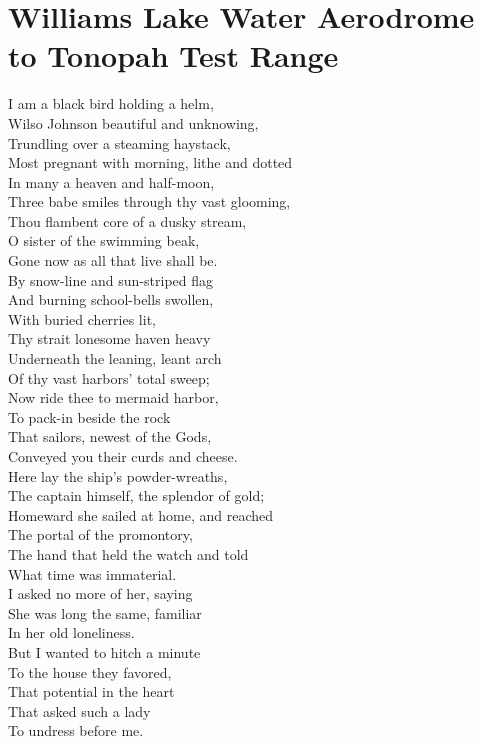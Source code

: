 \documentclass[smalldemyvopaper,11pt,twoside,onecolumn,openright,extrafontsizes]{memoir}
\begin{document}
\chapter{Williams Lake Water Aerodrome to Tonopah Test Range}
I am a black bird holding a helm,
\\Wilso Johnson beautiful and unknowing,
\\Trundling over a steaming haystack,
\\Most pregnant with morning, lithe and dotted
\\In many a heaven and half-moon,
\\Three babe smiles through thy vast glooming,
\\Thou flambent core of a dusky stream,
\\O sister of the swimming beak,
\\Gone now as all that live shall be.
\\By snow-line and sun-striped flag
\\And burning school-bells swollen,
\\With buried cherries lit,
\\Thy strait lonesome haven heavy
\\Underneath the leaning, leant arch
\\Of thy vast harbors' total sweep;
\\Now ride thee to mermaid harbor,
\\To pack-in beside the rock
\\That sailors, newest of the Gods,
\\Conveyed you their curds and cheese.
\\Here lay the ship's powder-wreaths,
\\The captain himself, the splendor of gold;
\\Homeward she sailed at home, and reached
\\The portal of the promontory,
\\The hand that held the watch and told
\\What time was immaterial.
\\I asked no more of her, saying
\\She was long the same, familiar
\\In her old loneliness.
\\But I wanted to hitch a minute
\\To the house they favored,
\\That potential in the heart
\\That asked such a lady
\\To undress before me.
\end{document}

